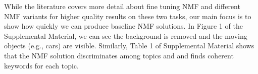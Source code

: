 While the literature covers more detail about fine tuning NMF and different NMF variants for higher quality results on these two tasks, our main focus is to show how quickly we can produce baseline NMF solutions. 
In Figure 1 of the Supplemental Material, we can see the background is removed and the moving objects (e.g., cars) are visible. 
Similarly, Table 1 of Supplemental Material shows that the NMF solution discriminates among topics and and finds coherent keywords for each topic. 

%
%

